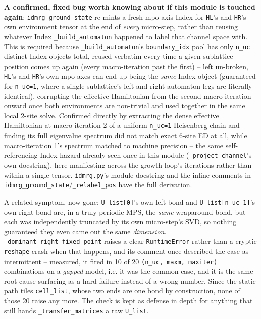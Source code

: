 \documentclass[11pt]{article}
\begin{document}
\textbf{A confirmed, fixed bug worth knowing about if this module is
touched again}: \texttt{idmrg\_ground\_state} re-mints a fresh mpo-axis
Index for \texttt{HL}'s and \texttt{HR}'s own environment tensor at the
end of \emph{every} micro-step, rather than reusing whatever Index
\texttt{\_build\_automaton} happened to label that channel space with.
This is required because \texttt{\_build\_automaton}'s
\texttt{boundary\_idx} pool has only \texttt{n\_uc} distinct Index
objects total, reused verbatim every time a given sublattice position
comes up again (every macro-iteration past the first) -- left
un-broken, \texttt{HL}'s and \texttt{HR}'s own mpo axes can end up being
the \emph{same} Index object (guaranteed for \texttt{n\_uc=1}, where a
single sublattice's left and right automaton legs are literally
identical), corrupting the effective Hamiltonian from the second
macro-iteration onward once both environments are non-trivial and used
together in the same local 2-site solve. Confirmed directly by
extracting the dense effective Hamiltonian at macro-iteration 2 of a
uniform \texttt{n\_uc=1} Heisenberg chain and finding its full
eigenvalue spectrum did not match exact 6-site ED at all, while
macro-iteration 1's spectrum matched to machine precision -- the same
self-referencing-Index hazard already seen once in this module
(\texttt{\_project\_channel}'s own docstring), here manifesting across
the growth loop's iterations rather than within a single tensor.
\texttt{idmrg.py}'s module docstring and the inline comments in
\texttt{idmrg\_ground\_state}/\texttt{\_relabel\_pos} have the full
derivation.

A related symptom, now gone: \texttt{U\_list[0]}'s own left bond and
\texttt{U\_list[n\_uc-1]}'s own right bond are, in a truly periodic MPS,
the \emph{same} wraparound bond, but each was independently truncated by
its own micro-step's SVD, so nothing guaranteed they even came out the
same \emph{dimension}. \texttt{\_dominant\_right\_fixed\_point} raises a
clear \texttt{RuntimeError} rather than a cryptic \texttt{reshape} crash
when that happens, and its comment once described the case as
intermittent -- measured, it fired in 10 of 20
\texttt{(n\_uc, maxm, maxiter)} combinations on a \emph{gapped} model,
i.e. it was the common case, and it is the same root cause surfacing as a
hard failure instead of a wrong number. Since the static path tiles
\texttt{cell\_list}, whose two ends are one bond by construction, none of
those 20 raise any more. The check is kept as defense in depth for
anything that still hands \texttt{\_transfer\_matrices} a raw
\texttt{U\_list}.
\end{document}
